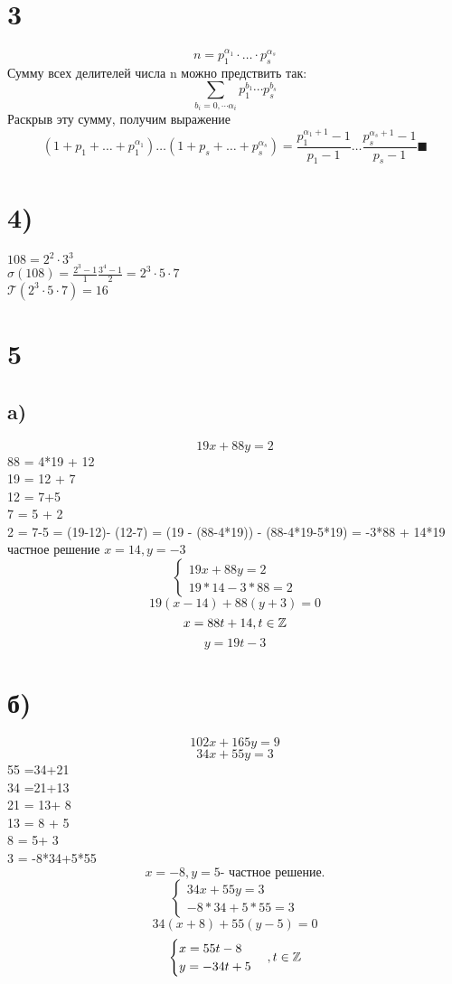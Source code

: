 \section*{3}
$$n = p_1^{\alpha_1}\cdot\dots \cdot p_s^{\alpha_s} $$
Сумму всех делителей числа n можно предствить так: $$\sum_{b_i = 0, \cdots \alpha_i} p_1^{b_1}\cdots p_s^{b_s}$$
Раскрыв эту сумму, получим выражение 
$$(1+p_1 + \dots + p_1^{\alpha_1})\dots(1+p_s + \dots + p_s^{\alpha_s}) = \frac{p_1^{\alpha_1+1}-1}{p_1-1}\dots \frac{p_s^{\alpha_s+1}-1}{p_s-1} \blacksquare$$ 
\section*{4)}
$108 = 2^2 \cdot 3^3$\\
$\sigma(108) = \frac{2^3-1}{1}\frac{3^4-1}{2} = 2^3\cdot5\cdot7$\\
$\mathcal{T}(2^3\cdot5\cdot7 ) = 16$
\section*{5}
\subsection*{a)}
$$19x+88y = 2$$
88 = 4*19 + 12 \\
19 = 12 +  7 \\ 
12 = 7+5  \\
7 = 5 + 2 \\
2 = 7-5 = (19-12)- (12-7) = (19 - (88-4*19)) - (88-4*19-5*19) = -3*88 + 14*19  \\
частное решение $x = 14, y = -3$
$$\begin{cases}19x+88y = 2 \\
19*14-3*88 = 2\end{cases}$$
$$19(x-14)+ 88(y+3) = 0$$
$$x = 88t+14, t \in \mathbb{Z}$$
$$y = 19t-3$$
\section*{б)}
$$102x+165y = 9$$
$$34x+55y = 3$$
55  =34+21 \\
34  =21+13 \\
21 = 13+ 8\\
13 = 8 + 5\\
8  = 5+ 3 \\
3 = -8*34+5*55\\
$$x = -8, y = 5 \text{- частное решение.}$$
$$\begin{cases}
	34x+55y = 3 \\
	-8*34 + 5*55 = 3 
\end{cases}$$
$$34(x+8)+55(y-5) = 0$$
$$\begin{cases}
	x = 55t-8 \\
	y = -34t+5
	\end{cases}, t\in \mathbb{Z}$$
